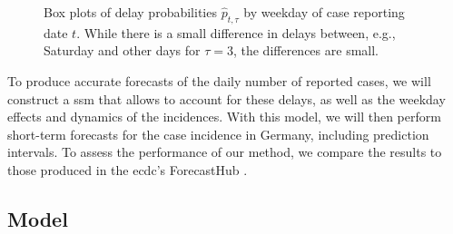 \begin{figure}
    \resizebox{\textwidth}{!}{%
    }
    \caption{Box plots of delay probabilities $\hat p_{t,\tau}$ by weekday of case reporting date $t$. While there is a small difference in delays between, e.g., Saturday and other days for $\tau = 3$, the differences are small.}
    \label{fig:weekday_effect_delays}
\end{figure}

To produce accurate forecasts of the daily number of reported cases, we will construct a \acrshort{ssm} that allows to account for these delays, as well as the weekday effects and dynamics of the incidences. With this model, we will then perform short-term forecasts for the case incidence in Germany, including prediction intervals. To assess the performance of our method, we compare the results to those produced in the \acrfull{ecdc}'s ForecastHub \citep{Sherratt2022Predictive}.

\subsection{Model}

